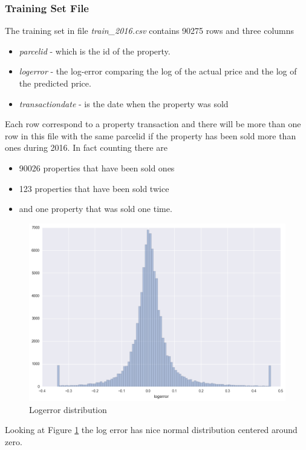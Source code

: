 \documentclass[a4paper]{article}
\begin{document}
\subsubsection{Training Set File}
The training set in file \textit{train\_2016.csv} contains 90275 rows and three columns
\begin{itemize}
    \item \textit{parcelid} - which is the id of the property.
    \item \textit{logerror} - the log-error comparing the log of the actual price and the log of the predicted price.
    \item \textit{transactiondate} - is the date when the property was sold
\end{itemize}

Each row correspond to a property transaction and there will be more than one row in this file with the same
parcelid if the property has been sold more than ones during 2016. In fact counting there are
\begin{itemize}
    \item 90026 properties that have been sold ones
    \item 123 properties that have been sold twice
    \item and one property that was sold one time.
\end{itemize}

\begin{figure}
\centering
\includegraphics[width=1\textwidth]{./img/train-logerror.png}
\caption{\label{fig:logerror}Logerror distribution}
\end{figure}
Looking at Figure \ref{fig:logerror} the log error has nice normal distribution centered around zero.
\end{document}
